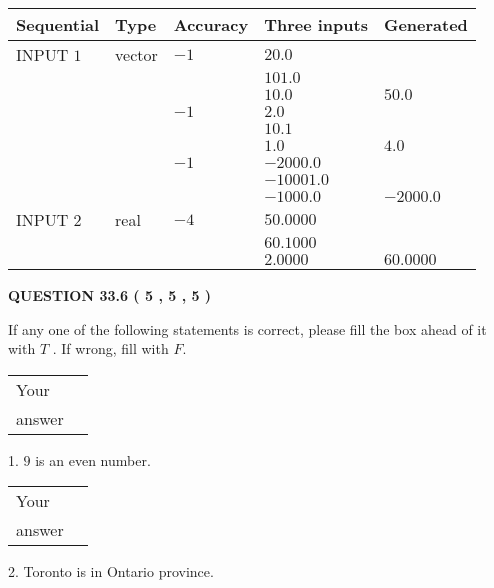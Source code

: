 \documentclass[12pt]{article}
\begin{document}
   
  
  
\noindent\begin{tabular}{|l|l|l|l|l|}
\hline
 Sequential & Type & Accuracy & Three inputs & Generated \\ 
\hline
 
 
  INPUT $            1 $ & vector & $           -1  $ & $
20.0
  $ & \\
  & & & $
101.0
  $ & \\
  & & & $
10.0
$ & $ 50.0 $ 
  \\
  & & $           -1  $ & $
2.0
  $ & \\
  & & & $
10.1
  $ & \\
  & & & $
1.0
$ & $ 4.0 $ 
  \\
  & & $           -1  $ & $
-2000.0
  $ & \\
  & & & $
-10001.0
  $ & \\
  & & & $
-1000.0
$ & $ -2000.0 $ 
 \\  \hline  
 
 
  INPUT $            2 $ & real & $           -4  $ & $
 50.0000
  $ & \\
  & & &  $
 60.1000
  $ & \\
  & & &  $
 2.0000
 $ & $ 60.0000 $ 
 \\  \hline  
 \end{tabular}
   
   
  
\vspace{0.2in}
  
{\textbf{\Large{QUESTION
33.6 
 (           5 ,           5 ,           5 )
}}}
  
  
If any one of the following statements is correct, please fill the box ahead of it with $T$ .
If wrong, fill with $F$.
 
\noindent\begin{tabular}{|l|l|}\hline Your&\hspace{.2in} \\ answer&\hspace{.2in} \\ \hline \end{tabular}
1. $ %
9$ is an  %
even number.
 
\noindent\begin{tabular}{|l|l|}\hline Your&\hspace{.2in} \\ answer&\hspace{.2in} \\ \hline \end{tabular}
2.  %
Toronto is in  %
Ontario province.
 
\end{document}
